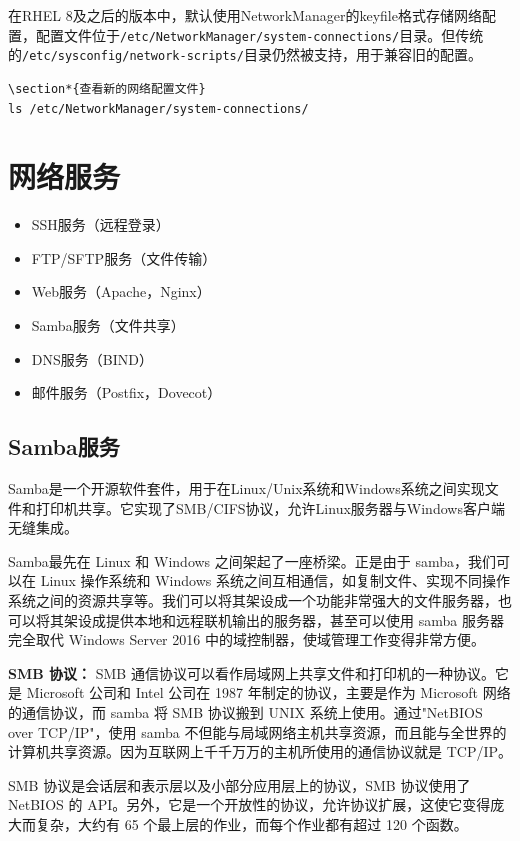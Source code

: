 \documentclass[12pt,UTF8]{ctexbook}
\begin{document}
在RHEL 8及之后的版本中，默认使用NetworkManager的keyfile格式存储网络配置，配置文件位于\texttt{/etc/NetworkManager/system-connections/}目录。但传统的\texttt{/etc/sysconfig/network-scripts/}目录仍然被支持，用于兼容旧的配置。

\begin{verbatim}
\section*{查看新的网络配置文件}
ls /etc/NetworkManager/system-connections/
\end{verbatim}

\section{网络服务}
\begin{itemize}
    \item SSH服务（远程登录）
    \item FTP/SFTP服务（文件传输）
    \item Web服务（Apache，Nginx）
    \item Samba服务（文件共享）
    \item DNS服务（BIND）
    \item 邮件服务（Postfix，Dovecot）
\end{itemize}

\subsection{Samba服务}
Samba是一个开源软件套件，用于在Linux/Unix系统和Windows系统之间实现文件和打印机共享。它实现了SMB/CIFS协议，允许Linux服务器与Windows客户端无缝集成。

Samba最先在 Linux 和 Windows 之间架起了一座桥梁。正是由于 samba，我们可以在 Linux 操作系统和 Windows 系统之间互相通信，如复制文件、实现不同操作系统之间的资源共享等。我们可以将其架设成一个功能非常强大的文件服务器，也可以将其架设成提供本地和远程联机输出的服务器，甚至可以使用 samba 服务器完全取代 Windows Server 2016 中的域控制器，使域管理工作变得非常方便。

\textbf{SMB 协议：}
SMB 通信协议可以看作局域网上共享文件和打印机的一种协议。它是 Microsoft 公司和 Intel 公司在 1987 年制定的协议，主要是作为 Microsoft 网络的通信协议，而 samba 将 SMB 协议搬到 UNIX 系统上使用。通过"NetBIOS over TCP/IP"，使用 samba 不但能与局域网络主机共享资源，而且能与全世界的计算机共享资源。因为互联网上千千万万的主机所使用的通信协议就是 TCP/IP。

SMB 协议是会话层和表示层以及小部分应用层上的协议，SMB 协议使用了 NetBIOS 的 API。另外，它是一个开放性的协议，允许协议扩展，这使它变得庞大而复杂，大约有 65 个最上层的作业，而每个作业都有超过 120 个函数。
\end{document}

